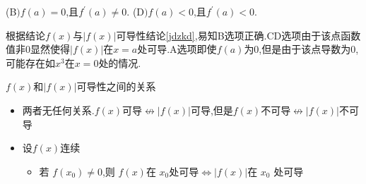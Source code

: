 \documentclass[8pt a4paper, oneside, UTF8]{ctexbook}  %
\begin{document}
\begin{sloppypar}
\begin{problem}
        (B$)f(a)=0$,且$f^\prime(a)\neq0.$ \quad   (D$)f(a)<0$,且$f^\prime(a)<0.$        
    \end{problem}
    \begin{solution}
        根据结论$f(x)$与$|f(x)|$可导性结论\ref{jdzkd},易知B选项正确.CD选项由于该点函数值非0显然使得$|f(x)|$在$x=a$处可导.A选项即使$f(a)$为0,但是由于该点导数为0,可能存在如$x^3$在$x=0$处的情况.
    \end{solution}
    \begin{lemma}{$f(x)$和$|f(x)|$可导性之间的关系}{}\label{jdzkd}
        \begin{itemize}
            \item 两者无任何关系.$f(x)$可导$\nleftrightarrow |f(x)|$可导,但是$f(x)$不可导$\nleftrightarrow |f(x)|$不可导
            \item 设$f(x)$连续
            \begin{itemize}
                \item 若 $f\left(x_{0}\right)\neq$0,则 $f\left(x\right)$在 $x_{0}$处可导$\Leftrightarrow\left|f\left(x\right)\right|$在 $x_{0}$ 处可导


\end{itemize}
\end{itemize}
\end{lemma}
\end{sloppypar}
\end{document}
